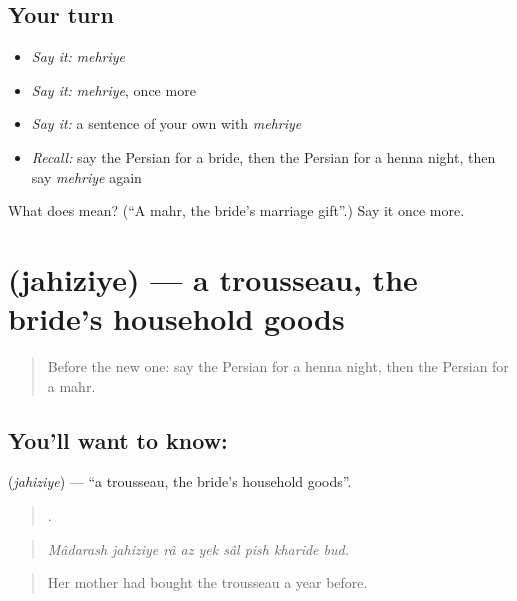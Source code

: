 \subsection*{Your turn}
\begin{itemize}
\raggedright
  \item \emph{Say it:} \emph{mehriye}
  \item \emph{Say it:} \emph{mehriye}, once more
  \item \emph{Say it:} a sentence of your own with \emph{mehriye}
  \item \emph{Recall:} say the Persian for a bride, then the Persian for a henna night, then say \emph{mehriye} again
\end{itemize}

\begin{tcolorbox}[breakable,colback=teal!4,colframe=teal!35!black,title={Before you move on}]
What does  mean? (\textquotedblleft{}A mahr, the bride's marriage gift\textquotedblright{}.) Say it once more.
\end{tcolorbox}
\section[\texorpdfstring{\fa{جهیزیه} (jahiziye)}{جهیزیه (jahiziye)}]{ (jahiziye) — a trousseau, the bride's household goods}

\label{lesson:FA-C335-jahiziye}



\begin{quote}
Before the new one: say the Persian for a henna night, then the Persian for a mahr.
\end{quote}

\subsection*{You'll want to know: }
\textbf{} (\emph{jahiziye}) — \textquotedblleft{}a trousseau, the bride's household goods\textquotedblright{}.

\begin{quote}
        .
\end{quote}

\begin{quote}
\emph{Mâdarash jahiziye râ az yek sâl pish kharide bud.}
\end{quote}

\begin{quote}
Her mother had bought the trousseau a year before.
\end{quote}


